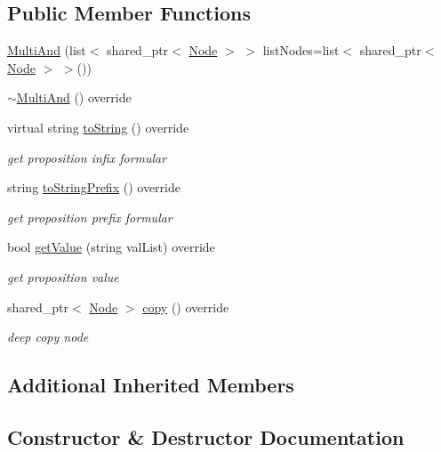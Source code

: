 \subsection*{Public Member Functions}
\begin{DoxyCompactItemize}
\item 
\hyperlink{class_multi_and_af78c9976d483175359a7c372231b2ac3}{Multi\+And} (list$<$ shared\+\_\+ptr$<$ \hyperlink{class_node}{Node} $>$ $>$ list\+Nodes=list$<$ shared\+\_\+ptr$<$ \hyperlink{class_node}{Node} $>$ $>$())
\item 
\hyperlink{class_multi_and_a2fe5c4c9809102fc779016d608e3f57d}{$\sim$\+Multi\+And} () override
\item 
virtual string \hyperlink{class_multi_and_a035299de4f81beb44a9a5df63b0d5178}{to\+String} () override
\begin{DoxyCompactList}\small\item\em get proposition infix formular \end{DoxyCompactList}\item 
string \hyperlink{class_multi_and_a00dd6431f647c88e28d702dd2afb1c57}{to\+String\+Prefix} () override
\begin{DoxyCompactList}\small\item\em get proposition prefix formular \end{DoxyCompactList}\item 
bool \hyperlink{class_multi_and_a7730036f89cf27cddcf6d2efc293dd9d}{get\+Value} (string val\+List) override
\begin{DoxyCompactList}\small\item\em get proposition value \end{DoxyCompactList}\item 
shared\+\_\+ptr$<$ \hyperlink{class_node}{Node} $>$ \hyperlink{class_multi_and_ad89e8cb08fe1e0793e2e16e837992de2}{copy} () override
\begin{DoxyCompactList}\small\item\em deep copy node \end{DoxyCompactList}\end{DoxyCompactItemize}
\subsection*{Additional Inherited Members}


\subsection{Constructor \& Destructor Documentation}
\mbox{\label{class_multi_and_af78c9976d483175359a7c372231b2ac3}} 

